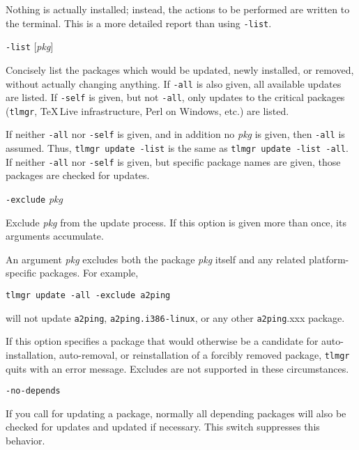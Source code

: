 \documentclass[11pt]{article}
\begin{document}
\begin{description}
Nothing is actually installed; instead, the actions to
be performed are written to the terminal. This is a more
detailed report than using \texttt{-list}.

\item\texttt{-list} [\textsl{pkg}]\par 

Concisely list the packages which would be updated, newly
installed, or removed, without actually changing anything.
If \texttt{-all} is also given, all available updates are
listed. If \texttt{-self} is given, but not \texttt{-all},
only updates to the critical packages (\texttt{tlmgr},
\TeX\,Live infrastructure, Perl on Windows, etc.) are listed.

If neither \texttt{-all} nor \texttt{-self} is given, and
in addition no \textsl{pkg} is given, then \texttt{-all} is
assumed. Thus, \mbox{\texttt{tlmgr update -list}} is the
same as \mbox{\texttt{tlmgr update -list -all}}. If neither
\texttt{-all} nor \texttt{-self} is given, but specific
package names are given, those packages are checked for
updates.

\item\texttt{-exclude} \textsl{pkg}\par 

Exclude \textsl{pkg} from the update process. If this option
is given more than once, its arguments accumulate.

An argument \textsl{pkg} excludes both the package
\textsl{pkg} itself and any related platform-specific
packages. For example,

\begin{center}
  \texttt{tlmgr update -all -exclude a2ping}
\end{center}

will not update \texttt{a2ping}, \texttt{a2ping.i386-linux},
or any other \mbox{\texttt{a2ping}.xxx} package.

If this option specifies a package that would otherwise
be a candidate for auto-installation, auto-removal, or
reinstallation of a forcibly removed package, \texttt{tlmgr}
quits with an error message. Excludes are not supported in
these circumstances.



\item\texttt{-no-depends}\par 

If you call for updating a package, normally all depending
packages will also be checked for updates and updated if
necessary. This switch suppresses this behavior.

\end{description}
\end{document}
